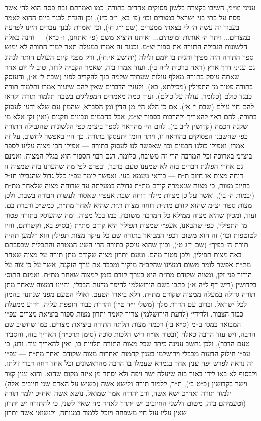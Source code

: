 \documentclass[12pt, openany]{book}
\begin{document}
עניני יצ״מ, השיבו בקצרה בלשון פסוקים אחדים בתורה, כמו ואמרתם זבח פסח הוא לה׳ אשר פסח על בתי בני ישראל במצרים וכו׳ (פ׳ בא, י״ב כ״ז), וכן והגדת לבנך ביום ההוא לאמר בעבור זה עשה ה׳ לי בצאתי ממצרים (שם י״ג ח׳), וכן ואמרת לבנך עבדים היינו לפרעה במצרים... ויתר ה׳ אותות ומופתים... ואותנו הוציא משם (פ׳ ואתחנן, ו׳ כ״א) — והנה באלה הלשונות הגבילה התורה את ספור יצ״מ. וכנגד זה אמרו במעלת תאר למוד התורה לא ימוש ספר התורה הזה מפיך והגית בו יומם ולילה (יהושע א׳:ח׳), ורק מפני קיום העולם הותר לנהוג גם עניני דרך ארץ (ראה ברכות ל״ה ב׳). ועוד אמרו בזה, שאמר הקב״ה לדוד, טוב לי יום אחד שאתה עוסק בתורה מאלף עולות שעתיד שלמה בנך להקריב לפני (שבת ל׳ א׳), והעוסק בתורה פטור מן התפילין (מכילתא, בא), ולענין הדברים שאין להם שיעור אמרו ותלמוד תורה כבגד כולם (כלומר, עולה על כולם), ועוד כמה מאמרים המפליגים בשבח תלמוד תורה וקראו להם חיי עולם (שבת י׳ א׳). אם כן הלא הי׳ מן הדין ומן הסברא, שהמון עם שלא ידעו לעסוק בתורה, להם ראוי להאריך ולהרבות בספור יצ״מ, אבל בחכמים ונבונים וזקנים (ואין זקן אלא מי שקנה חכמה (קדושין ל״ב ב׳), להם הי׳ מהראוי לספר ביצ״מ כפי הלשונות שהגבילה התורה כפי שחשבנו הפסוקים בהוראה זו, ויתר הזמן יתעסקו בתורה. כך הי׳ באפשר לחשוב, על זה אמרו, ואפילו כולנו הכמים וכו׳ שאפשר לנו לעסוק בתורה — אפילו הכי מצוה עלינו לספר ביצ״מ בארוכה וכל המרבה הרי זה משובח, כלומר, דגם רבוי הספור הוא בגלל המצוה. ואמנם גם אחרי הפלגת דברים בזה לא שמענו טעם בדבר, ובפרט לפי מה שהערנו בזה שמצוה זו דוחה מצות או חיוב ת״ת — בודאי טעמא בעי. ואפשר לומר עפ״י כלל גדול שהגבילו חז״ל בחיוב מצות, כי מצוה שנאמרה קודם מת״ת גדולה במעלתה עד שדוחה מצוה שלאחר מת״ת (יבמות ה׳ ב׳), ואשר על כן מצוות מילה דוחה שבת אעפ״י שאסור לעשות חבורה בשבת. ולכן מצות ספור יצ״מ שהוא קודם מת״ת דוחה מצות ת״ת שהיא לאחר  מת״ת, כמש״כ ודברת בם, ועוד, ומכיון שהיא מצוה ממילא כל המרבה משובח, כמו בכל מצוה. ומה שהעוסק בתורה פטור מן התפילין, כפי שהבאנו, אעפ״י שמצות תפילין היא קודם מת״ת (בס״פ בא, וקשרתם, והיו לטוטפות וכו׳) זה הוא משום דכפי המבואר בתורה שם כל עיקר מצות תפילין הוא ״למען תהיה תורת ה׳ בפיך״ (שם י״ג ט׳), וכיון שהוא עוסק בתורה הרי השיג המטרה והתכלית שבסבתם באה מצות תפילין, ולכן פטור מהם. וטעם יתרון מצוה שקודם מתן תורה על מצוה שאחר מת״ת אפשר לומר משום דמצינו שהקב״ה מוקיר ומכבד את ערך הזקנה, אשר על כן צוה על הידור פני זקן, ומצוה שקודם מת״ת היא בערך קודם בזמן למצוה שאחר מת״ת. ואמנם התוס׳ בקדושין (ריש דף ל״ה א׳) כתבו בשם הירושלמי להיפך מדעת הבבלי, והיינו דמצוה שאחר מתן תורה גדולה במעלה ממצוה שקודם מת״ת, דלא ביארו הטעם. ואולי הטעם מפני שנתנה בהמון לכל ישראל, וברוב עם הדרת מלך (משלי י״ד ט״ו) והדרת כבוד חופפת עליה. וידוע ממעלת כבוד הצבור. ולדידי׳ (לדעת הירושלמי) צריך לאמר יתרון מצות ספור ביציאת מצרים עפ״י המבואר במס׳ ב״מ (ס״א ב׳) דכמה מצות תלתה התורה ביציאת מצרים, כמו שחשיב שם הרבה, ויש עוד הרבה כאלה (ובטור או״ח ריש הלכות סוכה (סימן תרכ״ח) האריך בזה, והסביר טעם הדבר). ולכן נחשב ענינה כיתד שכל מצות התורה תלויות בו, ואין להאריך עוד. ודע, כי עפ״י חילוק הדעות מבבלי וירושלמי בענין קדמות ואחרות מצוה  שקודם ואחר מת״ת — עפ״י זה נראה לפרש יפה ענין אחד בגמרא שעמלו בו הרבה מהראשונים וכל אחד דחה דברי זולתו, ולבסוף לא באו לידי באור בזה שיעלה ישר ויפה ולא יסתר מן איזה מקום שהוא. והוא ענין קצר וישר בקדושין (כ״ט ב׳), ת״ר, ללמוד תורה ולישא אשה (כשיש על האדם שני חיובים אלה) ילמוד תורה ואח״כ ישא אשה, ורב יהודה אמר שמואל, נושא אשה ואח״כ ילמד תורה (וטעמיהם בזה, משום דלשני החיובים יש יתרון לאחד מה שאין לשני, כי להתורה יש יתרון שאין עליו עול חיי משפחה ויוכל ללמוד במנוחה, ולנשואי אשה יתרון 
\end{document}
